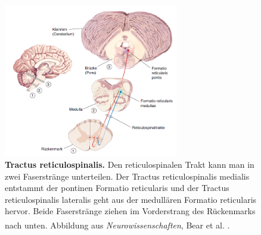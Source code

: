 \begin{figure}[H]
    \centering
    \includegraphics[width=0.68\textwidth]{pictures/Bilder_Laura/reticulospinaler_tract.PNG}
    \caption[Tractus reticulospinalis]{\textbf{Tractus reticulospinalis.} Den reticulospinalen Trakt kann man in zwei Faserstränge unterteilen. Der Tractus reticulospinalis medialis entstammt der pontinen Formatio reticularis und der Tractus reticulospinalis lateralis geht aus der medullären Formatio reticularis hervor. Beide Faserstränge ziehen im Vorderstrang des Rückenmarks nach unten. Abbildung aus \textit{Neurowissenschaften}, Bear et al. \textsuperscript{\cite[14]{neurowissenschaften_baer}}.}
    \label{fig:tr_reticulospinalis}
\end{figure}

